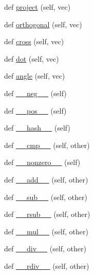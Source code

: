 \begin{DoxyCompactItemize}
def \hyperlink{classminivec_1_1minivec_1_1_vec_a36990fc110e133b4ee50a95965e6fa19}{project} (self, vec)
\item 
def \hyperlink{classminivec_1_1minivec_1_1_vec_ae6dfe759bb369d54948485099161bf1a}{orthogonal} (self, vec)
\item 
def \hyperlink{classminivec_1_1minivec_1_1_vec_aa4aec894883922ca4901a2ebc5ce8160}{cross} (self, vec)
\item 
def \hyperlink{classminivec_1_1minivec_1_1_vec_a026c12dff843c6a2dda345baf6a11bc6}{dot} (self, vec)
\item 
def \hyperlink{classminivec_1_1minivec_1_1_vec_ae57feb83d476b9ba9bec8d74603a9b1e}{angle} (self, vec)
\item 
def \hyperlink{classminivec_1_1minivec_1_1_vec_a51b8eb5018aa4fc5be94d4fdaf4e7bef}{\+\_\+\+\_\+neg\+\_\+\+\_\+} (self)
\item 
def \hyperlink{classminivec_1_1minivec_1_1_vec_aa3b1a2a83fe703afa6eb5f84cbad2f87}{\+\_\+\+\_\+pos\+\_\+\+\_\+} (self)
\item 
def \hyperlink{classminivec_1_1minivec_1_1_vec_ab17e5813d9c7f3fa56fc4592128e9eee}{\+\_\+\+\_\+hash\+\_\+\+\_\+} (self)
\item 
def \hyperlink{classminivec_1_1minivec_1_1_vec_ae0f860d7cfd7b0f008fbf846a772e3ee}{\+\_\+\+\_\+cmp\+\_\+\+\_\+} (self, other)
\item 
def \hyperlink{classminivec_1_1minivec_1_1_vec_a9806118391eb96ea97f4bf5427d40c41}{\+\_\+\+\_\+nonzero\+\_\+\+\_\+} (self)
\item 
def \hyperlink{classminivec_1_1minivec_1_1_vec_a15e11ffd0086905fd76638df069991fa}{\+\_\+\+\_\+add\+\_\+\+\_\+} (self, other)
\item 
def \hyperlink{classminivec_1_1minivec_1_1_vec_a94056d5948a4953a5b16aa88e85693c9}{\+\_\+\+\_\+sub\+\_\+\+\_\+} (self, other)
\item 
def \hyperlink{classminivec_1_1minivec_1_1_vec_ac6b1aae988f6cdba5e83a3b0291f1357}{\+\_\+\+\_\+rsub\+\_\+\+\_\+} (self, other)
\item 
def \hyperlink{classminivec_1_1minivec_1_1_vec_affb657e861acd24287f2faaf6a1e0ce4}{\+\_\+\+\_\+mul\+\_\+\+\_\+} (self, other)
\item 
def \hyperlink{classminivec_1_1minivec_1_1_vec_aba3d464d7c66b4bc517db32b6df1c5cb}{\+\_\+\+\_\+div\+\_\+\+\_\+} (self, other)
\item 
def \hyperlink{classminivec_1_1minivec_1_1_vec_a8768df83cc4ac5d21e38ee804d339210}{\+\_\+\+\_\+rdiv\+\_\+\+\_\+} (self, other)
\item 

\end{DoxyCompactItemize}
